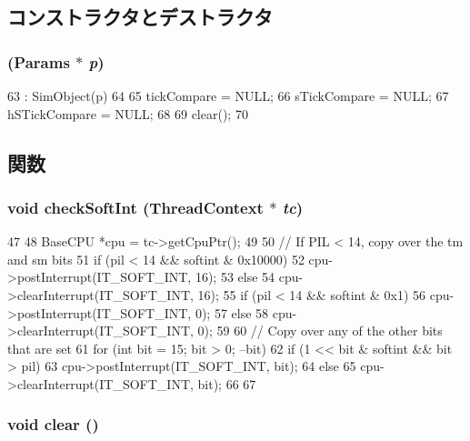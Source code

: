 \subsection{コンストラクタとデストラクタ}
\hypertarget{classSparcISA_1_1ISA_ae9132e021b3f3b20c917fc328a056bbd}{
\subsubsection[{ISA}]{ ({\bf Params} $\ast$ {\em p})}}
\label{classSparcISA_1_1ISA_ae9132e021b3f3b20c917fc328a056bbd}



\begin{DoxyCode}
63     : SimObject(p)
64 {
65     tickCompare = NULL;
66     sTickCompare = NULL;
67     hSTickCompare = NULL;
68 
69     clear();
70 }
\end{DoxyCode}


\subsection{関数}
\hypertarget{classSparcISA_1_1ISA_ae02c952584deaa6119c15c810faf6d54}{
\subsubsection[{checkSoftInt}]{\setlength{\rightskip}{0pt plus 5cm}void checkSoftInt ({\bf ThreadContext} $\ast$ {\em tc})}}
\label{classSparcISA_1_1ISA_ae02c952584deaa6119c15c810faf6d54}



\begin{DoxyCode}
47 {
48     BaseCPU *cpu = tc->getCpuPtr();
49 
50     // If PIL < 14, copy over the tm and sm bits
51     if (pil < 14 && softint & 0x10000)
52         cpu->postInterrupt(IT_SOFT_INT, 16);
53     else
54         cpu->clearInterrupt(IT_SOFT_INT, 16);
55     if (pil < 14 && softint & 0x1)
56         cpu->postInterrupt(IT_SOFT_INT, 0);
57     else
58         cpu->clearInterrupt(IT_SOFT_INT, 0);
59 
60     // Copy over any of the other bits that are set
61     for (int bit = 15; bit > 0; --bit) {
62         if (1 << bit & softint && bit > pil)
63             cpu->postInterrupt(IT_SOFT_INT, bit);
64         else
65             cpu->clearInterrupt(IT_SOFT_INT, bit);
66     }
67 }
\end{DoxyCode}
\hypertarget{classSparcISA_1_1ISA_ac8bb3912a3ce86b15842e79d0b421204}{
\subsubsection[{clear}]{\setlength{\rightskip}{0pt plus 5cm}void clear ()}}
\label{classSparcISA_1_1ISA_ac8bb3912a3ce86b15842e79d0b421204}



